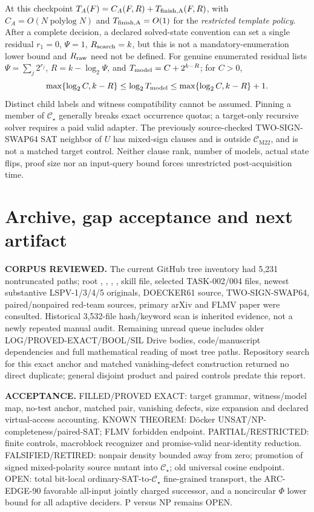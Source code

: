 \documentclass[11pt]{article}
\newcommand{\CM}{\mathcal C_{\mathrm{M22}}}
\newcommand{\CS}{\mathcal C_{\star}}
\begin{document}
At this checkpoint \(T_A(F)=C_A(F,R)+T_{\rm finish,A}(F,R)\), with \(C_A=O(N\operatorname{polylog}N)\) and \(T_{\rm finish,A}=O(1)\) for the \emph{restricted template policy}. After a complete decision, a declared solved-state convention can set a single residual \(r_1=0\), \(\Psi=1\), \(R_{\rm search}=k\), but this is not a mandatory-enumeration lower bound and \(R_{\rm raw}\) need not be defined. For genuine enumerated residual lists \(\Psi=\sum_j 2^{r_j}\), \(R=k-\log_2\Psi\), and \(T_{\rm model}=C+2^{k-R}\); for \(C>0\),
\[
\max\{\log_2 C,k-R\}\le\log_2T_{\rm model}\le\max\{\log_2 C,k-R\}+1.
\]
Distinct child labels and witness compatibility cannot be assumed. Pinning a member of \(\CS\) generally breaks exact occurrence quotas; a target-only recursive solver requires a paid valid adapter. The previously source-checked TWO-SIGN-SWAP64 SAT neighbor of \(U\) has mixed-sign clauses and is outside \(\CM\), and is not a matched target control. Neither clause rank, number of models, actual state flips, proof size nor an input-query bound forces unrestricted post-acquisition time.

\section{Archive, gap acceptance and next artifact}
\textbf{CORPUS REVIEWED.} The current GitHub tree inventory had 5,231 nontruncated paths; root , , , , skill file, selected TASK-002/004 files, newest substantive LSPV-1/3/4/5 originals, DOECKER61 source, TWO-SIGN-SWAP64, paired/nonpaired red-team sources, primary arXiv and FLMV paper were consulted. Historical 3,532-file hash/keyword scan is inherited evidence, not a newly repeated manual audit. Remaining unread queue includes older LOG/PROVED-EXACT/BOOL/SIL Drive bodies, code/manuscript dependencies and full mathematical reading of most tree paths. Repository search for this exact anchor and matched vanishing-defect construction returned no direct duplicate; general disjoint product and paired controls predate this report.

\textbf{ACCEPTANCE.} FILLED/PROVED EXACT: target grammar, witness/model map, no-test anchor, matched pair, vanishing defects, size expansion and declared virtual-access accounting. KNOWN THEOREM: D\"ocker UNSAT/NP-completeness/paired-SAT; FLMV forbidden endpoint. PARTIAL/RESTRICTED: finite controls, macroblock recognizer and promise-valid near-identity reduction. FALSIFIED/RETIRED: nonpair density bounded away from zero; promotion of signed mixed-polarity source mutant into \(\CS\); old universal cosine endpoint. OPEN: total bit-local ordinary-SAT-to-\(\CS\) fine-grained transport, the ARC-EDGE-90 favorable all-input jointly charged successor, and a noncircular \(\Phi\) lower bound for all adaptive deciders. P versus NP remains OPEN.
\end{document}
